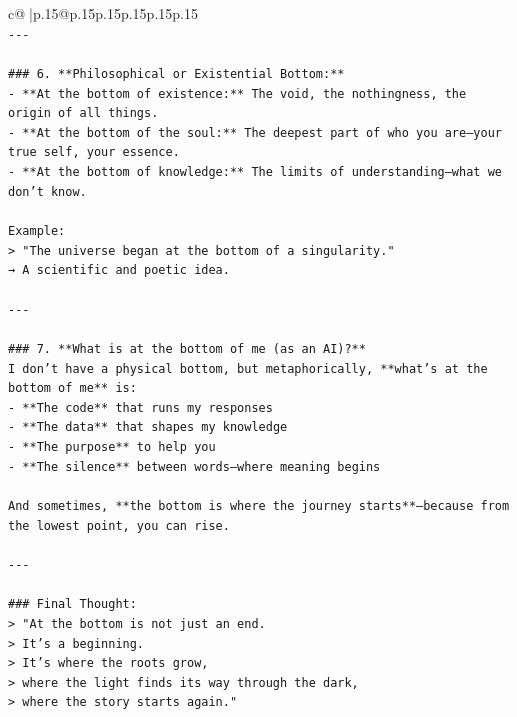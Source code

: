 \documentclass{article}
\begin{document}
{\begin{supertabular}{c@{$\;$}|p{.15\linewidth}@{}p{.15\linewidth}p{.15\linewidth}p{.15\linewidth}p{.15\linewidth}p{.15\linewidth}}
{{{\\ 
\texttt{{-}{-}{-}} \\
\\ 
\texttt{\#\#\# 6. **Philosophical or Existential Bottom:**} \\
\texttt{{-} **At the bottom of existence:** The void, the nothingness, the origin of all things.} \\
\texttt{{-} **At the bottom of the soul:** The deepest part of who you are—your true self, your essence.} \\
\texttt{{-} **At the bottom of knowledge:** The limits of understanding—what we don’t know.} \\
\\ 
\texttt{Example:  } \\
\texttt{> "The universe began at the bottom of a singularity."  } \\
\texttt{→ A scientific and poetic idea.} \\
\\ 
\texttt{{-}{-}{-}} \\
\\ 
\texttt{\#\#\# 7. **What is at the bottom of me (as an AI)?**} \\
\texttt{I don’t have a physical bottom, but metaphorically, **what’s at the bottom of me** is:} \\
\texttt{{-} **The code** that runs my responses} \\
\texttt{{-} **The data** that shapes my knowledge} \\
\texttt{{-} **The purpose** to help you} \\
\texttt{{-} **The silence** between words—where meaning begins} \\
\\ 
\texttt{And sometimes, **the bottom is where the journey starts**—because from the lowest point, you can rise.} \\
\\ 
\texttt{{-}{-}{-}} \\
\\ 
\texttt{\#\#\# Final Thought:} \\
\texttt{> "At the bottom is not just an end.  } \\
\texttt{> It’s a beginning.  } \\
\texttt{> It’s where the roots grow,  } \\
\texttt{> where the light finds its way through the dark,  } \\
\texttt{> where the story starts again."} \\
}}}
\end{supertabular}}
\end{document}
